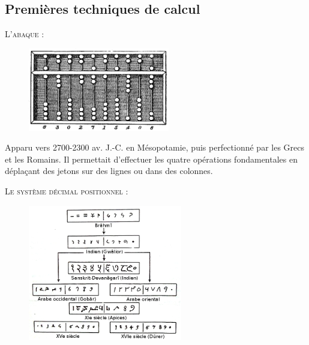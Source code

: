 \newpage 


\subsection{Premières techniques de calcul}

\textsc{ L'abaque :} 

\vspace{.35cm}

\begin{figure} %
    \vspace{-0.75cm} %
    \includegraphics[width=0.55\textwidth]{../images/Abacus.png}
\end{figure}

Apparu vers 2700-2300 av. J.-C. en Mésopotamie, puis perfectionné par les Grecs et les Romains. Il permettait d'effectuer les quatre opérations fondamentales en déplaçant des jetons sur des lignes ou dans des colonnes.


\newpage

\textsc{ Le système décimal positionnel :} 

\vspace{.35cm}

\begin{figure} %
    \vspace{-0.75cm} %
    \includegraphics[width=0.6\textwidth]{../images/Numeration.png}
\end{figure}

